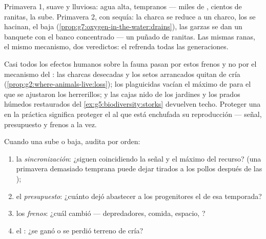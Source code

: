 \begin{example}\label{ex:g8:reproduction-and-environment:twosprings}
Primavera 1, suave y lluviosa: agua alta,  tempranos --- miles
de , cientos de ranitas, la  sube. Primavera 2, con
sequía: la charca se reduce a un charco, los  se hacinan, el
 baja (\cref{prop:g7:oxygen-in-the-water:drains}), las garzas se
dan un banquete con el banco concentrado --- un puñado de ranitas. Las
mismas ranas, el mismo mecanismo, dos veredictos: el  refrenda
todas las generaciones.
\end{example}

\begin{remark}\label{rem:g8:reproduction-and-environment:humans}
Casi todos los efectos humanos sobre la fauna pasan por estos frenos y
no por el mecanismo del : las charcas desecadas y los setos
arrancados quitan  de cría
(\cref{prop:g2:where-animals-live:loss}); los plaguicidas vacían el
máximo de  para el que se ajustaron los herrerillos; y las cajas
nido de los jardines y los prados húmedos restaurados del
\cref{ex:g5:biodiversity:storks} devuelven techo. Proteger una 
en la práctica significa proteger el  al que está enchufada su
reproducción --- señal, presupuesto y frenos a la vez.
\end{remark}

\begin{method}\label{met:g8:reproduction-and-environment:audit}
Cuando una  sube o baja, audita por orden:
\begin{enumerate}
  \item la \emph{sincronización}: ¿siguen coincidiendo la señal y el
        máximo del recurso? (una primavera demasiado temprana puede
        dejar tirados a los pollos después de las );
  \item el \emph{presupuesto}: ¿cuánto dejó abastecer a los
        progenitores el  de esa temporada?
  \item los \emph{frenos}: ¿cuál cambió --- depredadores, comida,
        espacio, ?
  \item el \emph{}: ¿se ganó o se perdió terreno de cría?
\end{enumerate}
\end{method}

